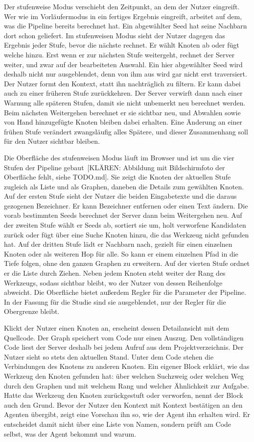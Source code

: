 Der stufenweise Modus verschiebt den Zeitpunkt, an dem der Nutzer eingreift. Wer wie im Vorläufermodus in ein fertiges Ergebnis eingreift, arbeitet auf dem, was die Pipeline bereits berechnet hat. Ein abgewählter Seed hat seine Nachbarn dort schon geliefert. Im stufenweisen Modus sieht der Nutzer dagegen das Ergebnis jeder Stufe, bevor die nächste rechnet. Er wählt Knoten ab oder fügt welche hinzu. Erst wenn er zur nächsten Stufe weitergeht, rechnet der Server weiter, und zwar auf der bearbeiteten Auswahl. Ein hier abgewählter Seed wird deshalb nicht nur ausgeblendet, denn von ihm aus wird gar nicht erst traversiert. Der Nutzer formt den Kontext, statt ihn nachträglich zu filtern. Er kann dabei auch zu einer früheren Stufe zurückkehren. Der Server verwirft dann nach einer Warnung alle späteren Stufen, damit sie nicht unbemerkt neu berechnet werden. Beim nächsten Weitergehen berechnet er sie sichtbar neu, und Abwahlen sowie von Hand hinzugefügte Knoten bleiben dabei erhalten. Eine Änderung an einer frühen Stufe verändert zwangsläufig alles Spätere, und dieser Zusammenhang soll für den Nutzer sichtbar bleiben.

Die Oberfläche des stufenweisen Modus läuft im Browser und ist um die vier Stufen der Pipeline gebaut~[KLÄREN: Abbildung mit Bildschirmfoto der Oberfläche fehlt, siehe TODO.md]. Sie zeigt die Knoten der aktuellen Stufe zugleich als Liste und als Graphen, daneben die Details zum gewählten Knoten. Auf der ersten Stufe sieht der Nutzer die beiden Eingabetexte und die daraus gezogenen Bezeichner. Er kann Bezeichner entfernen oder einen Text ändern. Die vorab bestimmten Seeds berechnet der Server dann beim Weitergehen neu. Auf der zweiten Stufe wählt er Seeds ab, sortiert sie um, holt verworfene Kandidaten zurück oder fügt über eine Suche Knoten hinzu, die das Werkzeug nicht gefunden hat. Auf der dritten Stufe lädt er Nachbarn nach, gezielt für einen einzelnen Knoten oder als weiteren Hop für alle. So kann er einem einzelnen Pfad in die Tiefe folgen, ohne den ganzen Graphen zu erweitern. Auf der vierten Stufe ordnet er die Liste durch Ziehen. Neben jedem Knoten steht weiter der Rang des Werkzeugs, sodass sichtbar bleibt, wo der Nutzer von dessen Reihenfolge abweicht. Die Oberfläche bietet außerdem Regler für die Parameter der Pipeline. In der Fassung für die Studie sind sie ausgeblendet, nur der Regler für die Obergrenze bleibt.

Klickt der Nutzer einen Knoten an, erscheint dessen Detailansicht mit dem Quellcode. Der Graph speichert vom Code nur einen Auszug. Den vollständigen Code liest der Server deshalb bei jedem Aufruf aus dem Projektverzeichnis. Der Nutzer sieht so stets den aktuellen Stand. Unter dem Code stehen die Verbindungen des Knotens zu anderen Knoten. Ein eigener Block erklärt, wie das Werkzeug den Knoten gefunden hat: über welchen Suchzweig oder welchen Weg durch den Graphen und mit welchem Rang und welcher Ähnlichkeit zur Aufgabe. Hatte das Werkzeug den Knoten zurückgestuft oder verworfen, nennt der Block auch den Grund. Bevor der Nutzer den Kontext mit \glqq{}Kontext bestätigen\grqq{} an den Agenten übergibt, zeigt eine Vorschau ihn so, wie der Agent ihn erhalten wird. Er entscheidet damit nicht über eine Liste von Namen, sondern prüft am Code selbst, was der Agent bekommt und warum.


